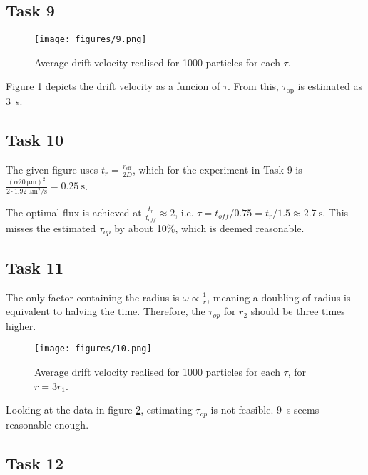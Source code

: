 \subsection*{Task 9}

\begin{figure}
    \centering
    \texttt{[image: figures/9.png]}
    \caption{
        Average drift velocity realised for 1000 particles for each $\tau$.
    }
    \label{fig:9}
\end{figure}

Figure \ref{fig:9} depicts the drift velocity as a funcion of $\tau$. 
From this, $\tau_\text{op}$ is estimated as \SI{3}{\second}.

\subsection*{Task 10}

The given figure uses $t_r = \frac{r_\text{eff}}{2D}$, 
which for the experiment in Task 9 is 
$\frac{(\alpha\SI{20}{\micro\metre})^2}{2\cdot\SI{1.92}{\micro\metre\squared\per\second}} 
= \SI{0.25}{\second}$.

The optimal flux is achieved at $\frac{t_r}{t_{off}} \approx 2$, 
i.e. $\tau = t_{off} / 0.75 = t_r / 1.5 \approx \SI{2.7}{\second}$.
This misses the estimated $\tau_{op}$ by about 10\%, 
which is deemed reasonable.

\subsection*{Task 11}

The only factor containing the radius is $\omega \propto \frac{1}{r}$, 
meaning a doubling of radius is equivalent to halving the time.
Therefore, the $\tau_{op}$ for $r_2$ should be three times higher.

\begin{figure}
    \centering
    \texttt{[image: figures/10.png]}
    \caption{
        Average drift velocity realised for 1000 particles for each $\tau$,
        for $r = 3r_1$.
    }
    \label{fig:10}
\end{figure}

Looking at the data in figure \ref{fig:10}, estimating $\tau_{op}$ 
is not feasible. \SI{9}{\second} seems reasonable enough.


\subsection*{Task 12}


